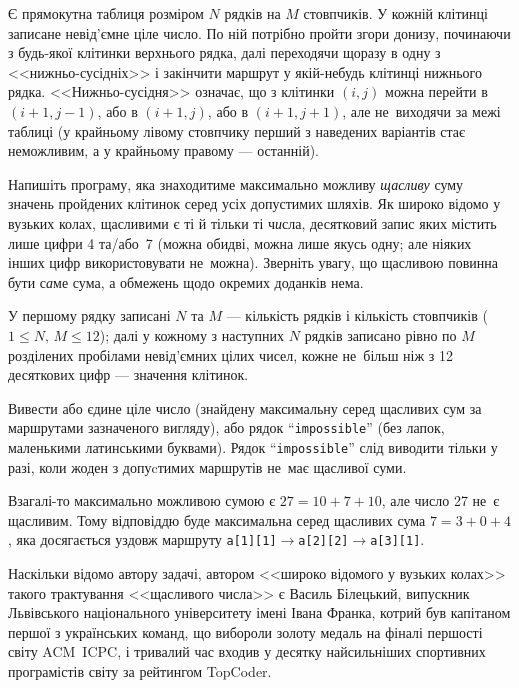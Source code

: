 ﻿Є прямокутна таблиця розміром $N$ рядків на $M$ стовпчиків. У кожній клітинці записане невід'ємне ціле число. 
По ній потрібно пройти згори донизу, починаючи з будь-якої клітинки верхнього рядка, 
далі переходячи щоразу в одну з <<нижньо-сусідніх>> і закінчити маршрут у якій-небудь клітинці нижнього рядка. 
<<Нижньо-сусідня>> означає, що з клітинки $(i,j)$ можна
перейти в ${(i+1, j-1)}$,
або в ${(i+1,j)}$,
або в ${(i+1,j+1)}$, 
але не~виходячи за межі таблиці (у крайньому лівому стовпчику перший з наведених варіантів стає неможливим, а у крайньому правому --- останній).

Напишіть програму, яка знаходитиме максимально можливу \emph{щасливу} суму значень пройдених клітинок 
серед усіх допустимих шляхів.
Як широко відомо у вузьких колах, щасливими є ті й тільки ті ч{\it и}сла, десятковий запис яких містить лише цифри 4 та/або~7 
(можна обидві, можна лише якусь одну; але ніяких інших цифр використовувати не~можна).
Зверніть увагу, що щасливою повинна бути с{\it а}ме сума, а обмежень щодо окремих доданків нема.

\InputFile
У першому рядку записані $N$ та $M$ --- кількість рядків і кількість стовпчиків 
($1\leqslant N,\,M\leqslant 12$); далі у кожному з наступних $N$ рядків 
записано рівно по $M$ розділених пробілами невід'ємних цілих чисел, 
кожне не~більш ніж з 12 десяткових цифр --- значення клітинок.

\OutputFile
Вивести або єдине ціле число (знайдену максимальну серед щасливих сум за маршрутами зазначеного вигляду), 
або рядок ``\texttt{impossible}'' (без лапок, маленькими латинськими буквами). 
Рядок ``\texttt{impossible}'' слід виводити тільки у разі, коли жоден з допуcтимих маршрутів не~має щасливої суми.

\begin{example}
\end{example}


\Note
Взагалі-то максимально можливою сумою є $27=10+7+10$, але число 27 не~є щасливим.
Тому відповіддю буде максимальна серед щасливих сума $7=3+0+4$, 
яка досягається уздовж маршруту \texttt{a[1][1]}$\to$\texttt{a[2][2]}$\to$\texttt{a[3][1]}.

Наскільки відомо автору задачі, автором <<широко відомого у вузьких колах>> такого трактування <<щасливого числа>>
є Василь Білецький, випускник Львівського національного університету імені Івана Франка,
котрий був капітаном першої з українських команд, що вибороли золоту медаль на фіналі першості світу ACM~ICPC,
і тривалий час входив у десятку найсильніших спортивних програмістів світу за рейтингом TopCoder.
